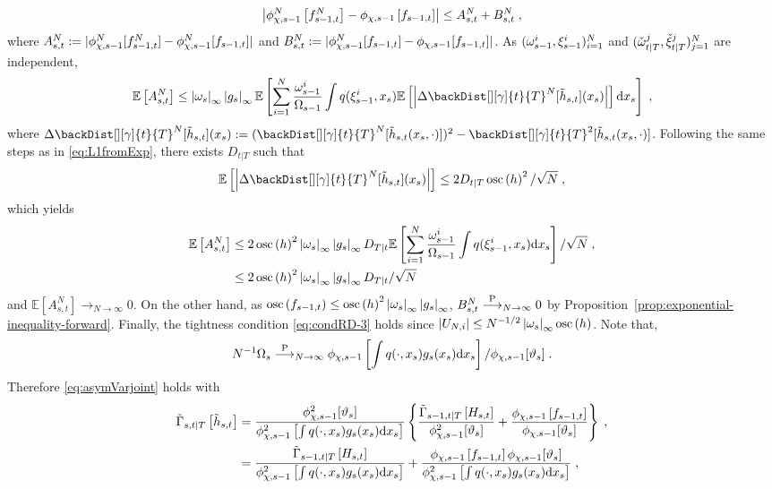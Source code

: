 \[
\left|\filt{\Xinit,s-1}^N\left[ f_{s-1,t}^N\right] - \filt{\Xinit,s-1} \left[ f_{s-1,t}\right]\right| \le A^N_{s,t} + B^N_{s,t} \eqsp,
\]
where $A^N_{s,t} \eqdef|\filt{\Xinit,s-1}^N[ f_{s-1,t}^N]  - \filt{\Xinit,s-1}^N[f_{s-1,t}]|$ 
 and $B^N_{s,t}  \eqdef |\filt{\Xinit,s-1}^N [f_{s-1,t}]-\filt{\Xinit,s-1}[f_{s-1,t}]|$. As $(\omega_{s-1}^{i},\xi_{s-1}^{i})_{i=1}^N$ and $({\check{\omega}}_{t|T}^{j},{\check{\xi}}_{t|T}^{j})_{j=1}^N$ are independent,
\[
\mathbb{E}\left[A^N_{s,t}\right] \le \esssup{\ewghtfunc{s}}\esssup{g_s}\mathbb{E}\left[\sum_{i=1}^N\frac{\ewght{s-1}{i}}{\sumwght{s-1}}\int  q(\epart{s-1}{i}, x_{s})\mathbb{E}\left[\left|\Delta  \backDist[][\gamma]{t}{T}^N[\tilde{h}_{s,t}](x_s)\right|\right]\rmd x_s\right]\eqsp,
\]
where $\Delta  \backDist[][\gamma]{t}{T}^N[\tilde{h}_{s,t}](x_s) \eqdef (\backDist[][\gamma]{t}{T}^N[\tilde{h}_{s,t}(x_s,\cdot)])^2- \backDist[][\gamma]{t}{T}^2[\tilde{h}_{s,t}(x_s,\cdot)]$.
Following the same steps as in \eqref{eq:L1fromExp}, there exists $D_{t|T}$ such that
\[
\mathbb{E}\left[\left|\Delta  \backDist[][\gamma]{t}{T}^N[\tilde{h}_{s,t}](x_s)\right|\right] \le 2D_{t|T}\oscnorm{h}^2/\sqrt{N}\eqsp,
\]
which yields
\begin{align*}
\mathbb{E}\left[A^N_{s,t}\right] &\le 2\oscnorm{h}^2\esssup{\ewghtfunc{s}}\esssup{g_s}D_{T|t}\mathbb{E}\left[\sum_{i=1}^N\frac{\ewght{s-1}{i}}{\sumwght{s-1}}\int  q(\epart{s-1}{i}, x_{s})\rmd x_s\right] /\sqrt{N}\eqsp,\\
&\le 2\oscnorm{h}^2\esssup{\ewghtfunc{s}}\esssup{g_s}D_{T|t}/\sqrt{N}
\end{align*}
and $\mathbb{E}\left[A^N_{s,t}\right]\longrightarrow_{N\to \infty}0 $. On the other hand, as $\oscnorm{f_{s-1,t}}\le \oscnorm{h}^2\esssup{\ewghtfunc{s}}\esssup{g_s}$, $B^N_{s,t}\stackrel{\mathrm{P}}{\longrightarrow}_{N \to \infty}0$ by Proposition~\ref{prop:exponential-inequality-forward}.
Finally, the tightness condition \eqref{eq:condRD-3} holds since $|U_{N,i}| \leq N^{-1/2}\esssup{\ewghtfunc{s}}\oscnorm{h}$. Note that,
\[
N^{-1}\sumwght{s}\plim_{N\to\infty} \filt{\chi,s-1}\left[\int q(\cdot,x_s)g_s(x_s)\rmd x_s\right]/\filt{\chi,s-1}[\adjfuncforward{s}]\eqsp.
\]
Therefore \eqref{eq:asymVarjoint} holds with
\begin{align*}
\asymVarJoint{s,t}{T}{\tilde{h}_{s,t}} &= \frac{\filt{\chi,s-1}^2[\adjfuncforward{s}]}{\filt{\chi,s-1}^2\left[\int q(\cdot,x_s)g_s(x_s)\rmd x_s\right]}\left\{\frac{\asymVarJoint{s-1,t}{T}{H_{s,t}}}{\filt{\chi,s-1}^2[\adjfuncforward{s}]}  +  \frac{\filt{\Xinit,s-1}\left[f_{s-1,t}\right]}{\filt{\chi,s-1}[\adjfuncforward{s}]}\right\}\eqsp,\\
&=   \frac{\asymVarJoint{s-1,t}{T}{H_{s,t}}}{\filt{\chi,s-1}^2\left[\int q(\cdot,x_s)g_s(x_s)\rmd x_s\right]}  +  \frac{\filt{\Xinit,s-1}\left[f_{s-1,t}\right]\filt{\chi,s-1}[\adjfuncforward{s}]}{\filt{\chi,s-1}^2\left[\int q(\cdot,x_s)g_s(x_s)\rmd x_s\right]}\eqsp,
\end{align*}
